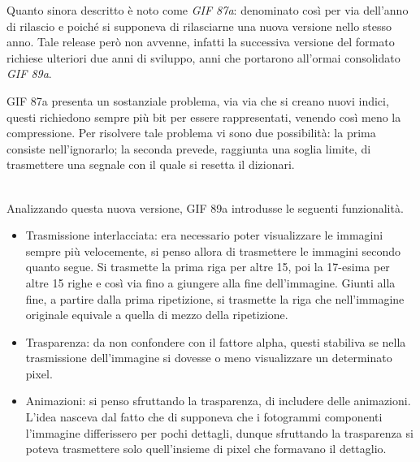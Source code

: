 \documentclass{subfiles}
\begin{document}
Quanto sinora descritto è noto come \emph{GIF 87a}: denominato così per via dell'anno di rilascio e poiché si supponeva di rilasciarne una nuova versione nello stesso anno.
Tale release però non avvenne, infatti la successiva versione del formato richiese ulteriori due anni di sviluppo, anni che portarono all'ormai consolidato \emph{GIF 89a}.

\begin{Remark*}
    GIF 87a presenta un sostanziale problema, via via che si creano nuovi indici, questi richiedono sempre più bit per essere rappresentati,
    venendo così meno la compressione. Per risolvere tale problema vi sono due possibilità: la prima consiste nell'ignorarlo; la seconda prevede, raggiunta una soglia limite,
    di trasmettere una segnale con il quale si resetta il dizionari.
\end{Remark*}
\hfill\\

Analizzando questa nuova versione, GIF 89a introdusse le seguenti funzionalità.
\begin{itemize}
    \item Trasmissione interlacciata: era necessario poter visualizzare le immagini sempre più velocemente, si penso allora di trasmettere le immagini secondo quanto segue.
          Si trasmette la prima riga per altre 15, poi la 17-esima per altre 15 righe e così via fino a giungere alla fine dell'immagine.
          Giunti alla fine, a partire dalla prima ripetizione, si trasmette la riga che nell'immagine originale equivale a quella di mezzo della ripetizione.

    \item Trasparenza: da non confondere con il fattore alpha, questi stabiliva se nella trasmissione dell'immagine si dovesse o meno visualizzare un determinato pixel.
    \item Animazioni: si penso sfruttando la trasparenza, di includere delle animazioni.
          L'idea nasceva dal fatto che di supponeva che i fotogrammi componenti l'immagine differissero per pochi dettagli,
          dunque sfruttando la trasparenza si poteva trasmettere solo quell'insieme di pixel che formavano il dettaglio.
\end{itemize}
\end{document}
